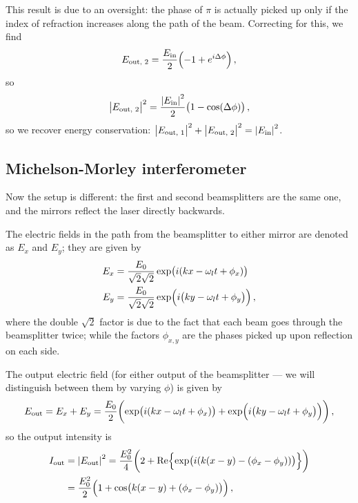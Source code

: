 \documentclass[main.tex]{subfiles}
\begin{document}
This result is due to an oversight: the phase of \(\pi \) is actually picked up only if the index of refraction increases along the path of the beam. Correcting for this, we find 
%
\begin{align}
E _{\text{out, }2}= \frac{E_{\text{in}}}{2} \qty(-1 + e^{i \Delta \phi })
\,,
\end{align}
%
so 
%
\begin{align}
\abs{E _{\text{out, }2}}^2 = \frac{\abs{E _{\text{in}}}^2}{2} \qty(1 - \cos(\Delta \phi))
\,,
\end{align}
%
so we recover energy conservation: \(\abs{E _{\text{out, }1}}^2 + \abs{E _{\text{out, }2}}^2 = \abs{E _{\text{in}}}^2\).

\subsection{Michelson-Morley interferometer}

Now the setup is different: the first and second beamsplitters are the same one, and the mirrors reflect the laser directly backwards. 

The electric fields in the path from the beamsplitter to either mirror are denoted as \(E_x\) and \(E_y\); they are given by 
%
\begin{align}
E_{x} &= \frac{E_0 }{\sqrt{2} \sqrt{2}}
\exp(i \qty(kx - \omega_{l}t + \phi_{x})) \\
E_{y} &= \frac{E_0 }{\sqrt{2} \sqrt{2}}
\exp(i \qty(ky - \omega_{l}t + \phi_{y}))
\,,
\end{align}
%
where the double \(\sqrt{2}\) factor is due to the fact that each beam goes through the beamsplitter twice; while the factors \(\phi_{x, y}\) are the phases picked up upon reflection on each side. 

The output electric field (for either output of the beamsplitter --- we will distinguish between them by varying \(\phi \)) is given by 
%
\begin{align}
E _{\text{out}} = E_{x} + E_{y}
= \frac{E_0}{2} \qty(\exp(i \qty(kx - \omega_{l}t + \phi_{x})) + \exp(i \qty(ky - \omega_{l}t + \phi_{y})))
\,,
\end{align}
%
so the output intensity is 
%
\begin{align}
I _{\text{out}} &= \abs{E _{\text{out}}}^2 
= \frac{E_0^2}{4} \qty(2 + \Re{\exp(i(k(x-y) - (\phi_{x} - \phi_{y}) ))})  \\
&= \frac{E_0^2}{2} \qty(1 + \cos(k(x-y) + (\phi_{x} - \phi_{y})))
\,,
\end{align}
%
\end{document}
